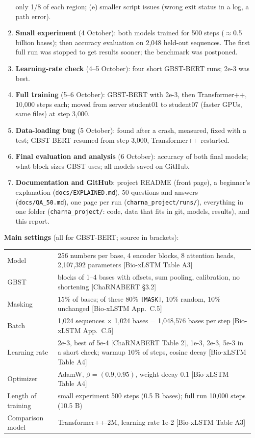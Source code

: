 \documentclass[11pt,a4paper]{article}
\newcommand{\code}[1]{\texttt{\small #1}}
\begin{document}
\begin{enumerate}[leftmargin=*]
  only 1/8 of each region; (e) smaller script issues (wrong exit status in a log, a path error).
\item \textbf{Small experiment} (4 October): both models trained for 500 steps
  ($\approx$0.5 billion bases); then accuracy evaluation on 2,048 held-out sequences. The
  first full run was stopped to get results sooner; the benchmark was postponed.
\item \textbf{Learning-rate check} (4--5 October): four short GBST-BERT runs; 2e-3 was best.
\item \textbf{Full training} (5--6 October): GBST-BERT with 2e-3, then Transformer++, 10,000 steps
  each; moved from server student01 to student07 (faster GPUs, same files) at step 3,000.
\item \textbf{Data-loading bug} (5 October): found after a crash, measured, fixed with a test;
  GBST-BERT resumed from step 3,000, Transformer++ restarted.
\item \textbf{Final evaluation and analysis} (6 October): accuracy of both final models; what
  block sizes GBST uses; all models saved on GitHub.
\item \textbf{Documentation and GitHub}: project README (front page), a beginner's explanation
  (\code{docs/EXPLAINED.md}), 50 questions and answers (\code{docs/QA\_50.md}), one page per run
  (\code{charna\_project/runs/}), everything in one folder (\code{charna\_project/}: code, data
  that fits in git, models, results), and this report.
\end{enumerate}

\textbf{Main settings} (all for GBST-BERT; source in brackets):
\begin{center}\small
\begin{tabularx}{0.95\linewidth}{lL}
\toprule
Model & 256 numbers per base, 4 encoder blocks, 8 attention heads, 2,107,392 parameters [Bio-xLSTM Table A3] \\
GBST & blocks of 1--4 bases with offsets, sum pooling, calibration, no shortening [ChaRNABERT \S3.2] \\
Masking & 15\% of bases; of these 80\% \code{[MASK]}, 10\% random, 10\% unchanged [Bio-xLSTM App.~C.5] \\
Batch & 1,024 sequences $\times$ 1,024 bases = 1,048,576 bases per step [Bio-xLSTM App.~C.5] \\
Learning rate & 2e-3, best of 5e-4 [ChaRNABERT Table 2], 1e-3, 2e-3, 5e-3 in a short check; warmup 10\% of steps, cosine decay [Bio-xLSTM Table A4] \\
Optimizer & AdamW, $\beta=(0.9, 0.95)$, weight decay 0.1 [Bio-xLSTM Table A4] \\
Length of training & small experiment 500 steps (0.5 B bases); full run 10,000 steps (10.5 B) \\
Comparison model & Transformer++-2M, learning rate 1e-2 [Bio-xLSTM Table A3] \\
\bottomrule
\end{tabularx}
\end{center}
\end{document}
